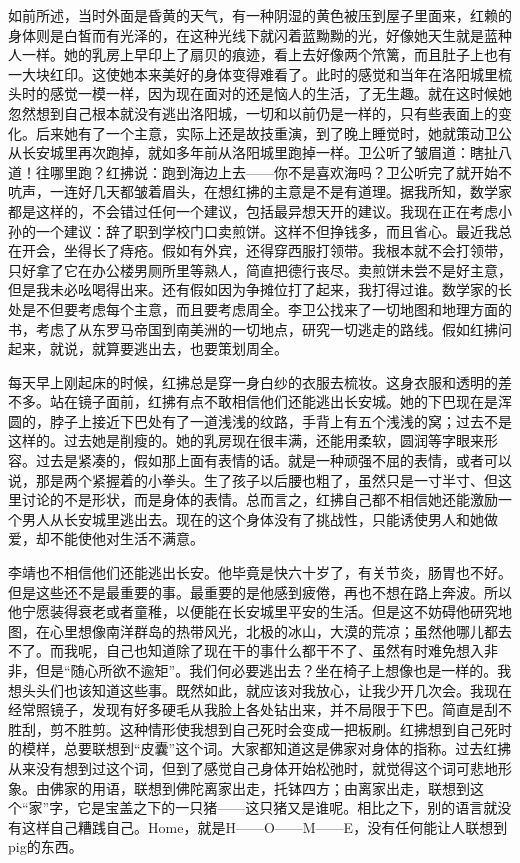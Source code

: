 如前所述，当时外面是昏黄的天气，有一种阴湿的黄色被压到屋子里面来，红赖的身体则是白皙而有光泽的，在这种光线下就闪着蓝黝黝的光，好像她天生就是蓝种人一样。她的乳房上早印上了扇贝的痕迹，看上去好像两个笊篱，而且肚子上也有一大块红印。这使她本来美好的身体变得难看了。此时的感觉和当年在洛阳城里梳头时的感觉一模一样，因为现在面对的还是恼人的生活，了无生趣。就在这时候她忽然想到自己根本就没有逃出洛阳城，一切和以前仍是一样的，只有些表面上的变化。后来她有了一个主意，实际上还是故技重演，到了晚上睡觉时，她就策动卫公从长安城里再次跑掉，就如多年前从洛阳城里跑掉一样。卫公听了皱眉道：瞎扯八道！往哪里跑？红拂说：跑到海边上去——你不是喜欢海吗？卫公听完了就开始不吭声，一连好几天都皱着眉头，在想红拂的主意是不是有道理。据我所知，数学家都是这样的，不会错过任何一个建议，包括最异想天开的建议。我现在正在考虑小孙的一个建议：辞了职到学校门口卖煎饼。这样不但挣钱多，而且省心。最近我总在开会，坐得长了痔疮。假如有外宾，还得穿西服打领带。我根本就不会打领带，只好拿了它在办公楼男厕所里等熟人，简直把德行丧尽。卖煎饼未尝不是好主意，但是我未必吆喝得出来。还有假如因为争摊位打了起来，我打得过谁。数学家的长处是不但要考虑每个主意，而且要考虑周全。李卫公找来了一切地图和地理方面的书，考虑了从东罗马帝国到南美洲的一切地点，研究一切逃走的路线。假如红拂问起来，就说，就算要逃出去，也要策划周全。 

每天早上刚起床的时候，红拂总是穿一身白纱的衣服去梳妆。这身衣服和透明的差不多。站在镜子面前，红拂有点不敢相信他们还能逃出长安城。她的下巴现在是浑圆的，脖子上接近下巴处有了一道浅浅的纹路，手背上有五个浅浅的窝；过去不是这样的。过去她是削瘦的。她的乳房现在很丰满，还能用柔软，圆润等字眼来形容。过去是紧凑的，假如那上面有表情的话。就是一种顽强不屈的表情，或者可以说，那是两个紧握着的小拳头。生了孩子以后腰也粗了，虽然只是一寸半寸、但这里讨论的不是形状，而是身体的表情。总而言之，红拂自己都不相信她还能激励一个男人从长安城里逃出去。现在的这个身体没有了挑战性，只能诱使男人和她做爱，却不能使他对生活不满意。 

李靖也不相信他们还能逃出长安。他毕竟是快六十岁了，有关节炎，肠胃也不好。但是这些还不是最重要的事。最重要的是他感到疲倦，再也不想在路上奔波。所以他宁愿装得衰老或者童稚，以便能在长安城里平安的生活。但是这不妨碍他研究地图，在心里想像南洋群岛的热带风光，北极的冰山，大漠的荒凉；虽然他哪儿都去不了。而我呢，自己也知道除了现在干的事什么都干不了、虽然有时难免想入非非，但是“随心所欲不逾矩”。我们何必要逃出去？坐在椅子上想像也是一样的。我想头头们也该知道这些事。既然如此，就应该对我放心，让我少开几次会。我现在经常照镜子，发现有好多硬毛从我脸上各处钻出来，并不局限于下巴。简直是刮不胜刮，剪不胜剪。这种情形使我想到自己死时会变成一把板刷。红拂想到自己死时的模样，总要联想到“皮囊”这个词。大家都知道这是佛家对身体的指称。过去红拂从来没有想到过这个词，但到了感觉自己身体开始松弛时，就觉得这个词可悲地形象。由佛家的用语，联想到佛陀离家出走，托钵四方；由离家出走，联想到这个“家”字，它是宝盖之下的一只猪——这只猪又是谁呢。相比之下，别的语言就没有这样自己糟践自己。Home，就是H——O——M——E，没有任何能让人联想到pig的东西。 

